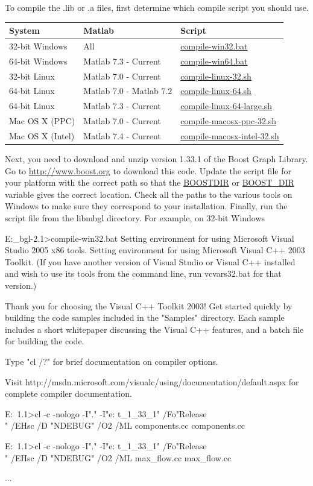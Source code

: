 \documentclass[12pt]{article}
\newcommand{\mycmd}[1]{\url{#1}}
\begin{document}
To compile the .lib or .a files, first determine which compile script you should use.  
\begin{center}
\begin{tabular}{lll}
\hline \hline
\textbf{System} & \textbf{Matlab} & \textbf{Script}\\
\hline
32-bit Windows & All & \mycmd{compile-win32.bat}\\
64-bit Windows & Matlab 7.3 - Current & \mycmd{compile-win64.bat}\\
32-bit Linux & Matlab 7.0 - Current & \mycmd{compile-linux-32.sh}\\
64-bit Linux & Matlab 7.0 - Matlab 7.2 & \mycmd{compile-linux-64.sh}\\
64-bit Linux & Matlab 7.3 - Current & \mycmd{compile-linux-64-large.sh}\\
Mac OS X (PPC) & Matlab 7.0 - Current & \mycmd{compile-macosx-ppc-32.sh}\\
Mac OS X (Intel) & Matlab 7.4 - Current & \mycmd{compile-macosx-intel-32.sh}\\
\hline
\end{tabular}
\end{center}
Next, you need to download and unzip version 1.33.1 of the Boost Graph Library.  Go to \url{http://www.boost.org} to download this code.  Update the script file for your platform with the correct path so that the \mycmd{BOOSTDIR} or \mycmd{BOOST_DIR} variable gives the correct location.  Check all the paths to the various tools on Windows to make sure they correspond to your installation.  
Finally, run the script file from the libmbgl directory.  For example, on 32-bit Windows
\begin{mcode}
E:\dev\matlab\download\matlab_bgl-2.1\libmbgl>compile-win32.bat
Setting environment for using Microsoft Visual Studio 2005 x86 tools.
Setting environment for using Microsoft Visual C++ 2003 Toolkit.
(If you have another version of Visual Studio or Visual C++ installed and wish
to use its tools from the command line, run vcvars32.bat for that version.)

Thank you for choosing the Visual C++ Toolkit 2003!  Get started quickly by
building the code samples included in the "Samples" directory.  Each sample
includes a short whitepaper discussing the Visual C++ features, and a batch
file for building the code.

Type "cl /?" for brief documentation on compiler options.

Visit http://msdn.microsoft.com/visualc/using/documentation/default.aspx for
complete compiler documentation.

E:\dev\matlab\download\MATLAB~1.1\libmbgl>cl -c -nologo -I"." -I"e:\dev\lib\boos
t_1_33_1" /Fo"Release\\" /EHsc /D "NDEBUG" /O2 /ML components.cc
components.cc

E:\dev\matlab\download\MATLAB~1.1\libmbgl>cl -c -nologo -I"." -I"e:\dev\lib\boos
t_1_33_1" /Fo"Release\\" /EHsc /D "NDEBUG" /O2 /ML max_flow.cc
max_flow.cc

...
\end{mcode}
\end{document}
